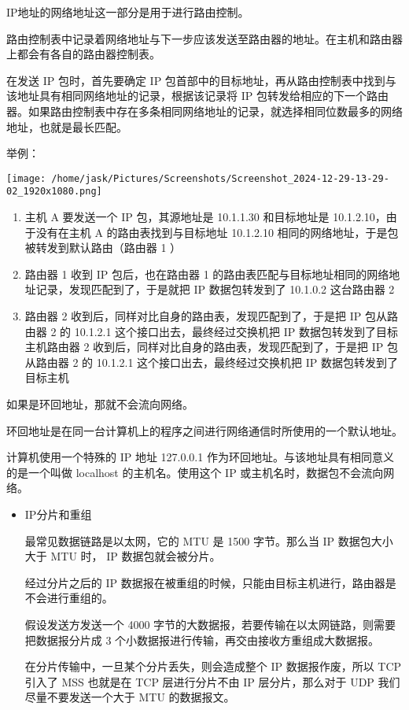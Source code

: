 \documentclass[11pt]{article}
\begin{document}
\begin{itemize}
IP地址的网络地址这一部分是用于进行路由控制。

路由控制表中记录着网络地址与下一步应该发送至路由器的地址。在主机和路由器上都会有各自的路由器控制表。

在发送 IP 包时，首先要确定 IP 包首部中的目标地址，再从路由控制表中找到与该地址具有相同网络地址的记录，根据该记录将 IP 包转发给相应的下一个路由器。如果路由控制表中存在多条相同网络地址的记录，就选择相同位数最多的网络地址，也就是最长匹配。

举例：
\begin{center}
\texttt{[image: /home/jask/Pictures/Screenshots/Screenshot\_2024-12-29-13-29-02\_1920x1080.png]}
\end{center}

\begin{enumerate}
\item 主机 A 要发送一个 IP 包，其源地址是 10.1.1.30 和目标地址是 10.1.2.10，由于没有在主机 A 的路由表找到与目标地址 10.1.2.10 相同的网络地址，于是包被转发到默认路由（路由器 1 ）

\item 路由器 1 收到 IP 包后，也在路由器 1 的路由表匹配与目标地址相同的网络地址记录，发现匹配到了，于是就把 IP 数据包转发到了 10.1.0.2 这台路由器 2

\item 路由器 2 收到后，同样对比自身的路由表，发现匹配到了，于是把 IP 包从路由器 2 的 10.1.2.1 这个接口出去，最终经过交换机把 IP 数据包转发到了目标主机路由器 2 收到后，同样对比自身的路由表，发现匹配到了，于是把 IP 包从路由器 2 的 10.1.2.1 这个接口出去，最终经过交换机把 IP 数据包转发到了目标主机
\end{enumerate}

如果是环回地址，那就不会流向网络。
\end{itemize}

环回地址是在同一台计算机上的程序之间进行网络通信时所使用的一个默认地址。

计算机使用一个特殊的 IP 地址 127.0.0.1 作为环回地址。与该地址具有相同意义的是一个叫做 localhost 的主机名。使用这个 IP 或主机名时，数据包不会流向网络。

\begin{itemize}
\item IP分片和重组

最常见数据链路是以太网，它的 MTU 是 1500 字节。那么当 IP 数据包大小大于 MTU 时， IP 数据包就会被分片。

经过分片之后的 IP 数据报在被重组的时候，只能由目标主机进行，路由器是不会进行重组的。

假设发送方发送一个 4000 字节的大数据报，若要传输在以太网链路，则需要把数据报分片成 3 个小数据报进行传输，再交由接收方重组成大数据报。

在分片传输中，一旦某个分片丢失，则会造成整个 IP 数据报作废，所以 TCP 引入了 MSS 也就是在 TCP 层进行分片不由 IP 层分片，那么对于 UDP 我们尽量不要发送一个大于 MTU 的数据报文。
\end{itemize}
\end{document}
